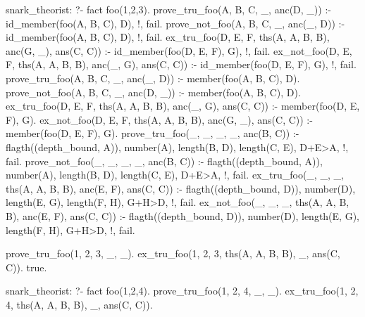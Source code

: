 snark_theorist:  ?- fact foo(1,2,3).
prove_tru_foo(A, B, C, _, anc(D, _)) :-
        id_member(foo(A, B, C), D), !,
        fail.
prove_not_foo(A, B, C, _, anc(_, D)) :-
        id_member(foo(A, B, C), D), !,
        fail.
ex_tru_foo(D, E, F, ths(A, A, B, B), anc(G, _), ans(C, C)) :-
        id_member(foo(D, E, F), G), !,
        fail.
ex_not_foo(D, E, F, ths(A, A, B, B), anc(_, G), ans(C, C)) :-
        id_member(foo(D, E, F), G), !,
        fail.
prove_tru_foo(A, B, C, _, anc(_, D)) :-
        member(foo(A, B, C), D).
prove_not_foo(A, B, C, _, anc(D, _)) :-
        member(foo(A, B, C), D).
ex_tru_foo(D, E, F, ths(A, A, B, B), anc(_, G), ans(C, C)) :-
        member(foo(D, E, F), G).
ex_not_foo(D, E, F, ths(A, A, B, B), anc(G, _), ans(C, C)) :-
        member(foo(D, E, F), G).
prove_tru_foo(_, _, _, _, anc(B, C)) :-
        flagth((depth_bound, A)),
        number(A),
        length(B, D),
        length(C, E),
        D+E>A, !,
        fail.
prove_not_foo(_, _, _, _, anc(B, C)) :-
        flagth((depth_bound, A)),
        number(A),
        length(B, D),
        length(C, E),
        D+E>A, !,
        fail.
ex_tru_foo(_, _, _, ths(A, A, B, B), anc(E, F), ans(C, C)) :-
        flagth((depth_bound, D)),
        number(D),
        length(E, G),
        length(F, H),
        G+H>D, !,
        fail.
ex_not_foo(_, _, _, ths(A, A, B, B), anc(E, F), ans(C, C)) :-
        flagth((depth_bound, D)),
        number(D),
        length(E, G),
        length(F, H),
        G+H>D, !,
        fail.


prove_tru_foo(1, 2, 3, _, _).
ex_tru_foo(1, 2, 3, ths(A, A, B, B), _, ans(C, C)).
true.


snark_theorist:  ?- fact foo(1,2,4).
prove_tru_foo(1, 2, 4, _, _).
ex_tru_foo(1, 2, 4, ths(A, A, B, B), _, ans(C, C)).

